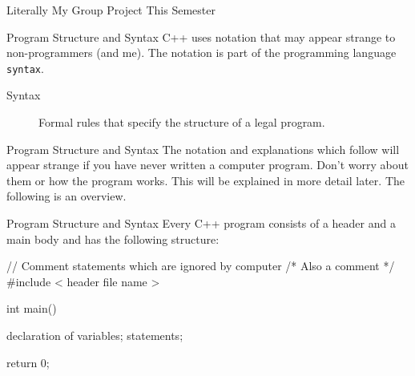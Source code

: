 \documentclass[../lecture1-introduction.tex]{subfiles}
\begin{document}

\begin{frame}[fragile]{Literally My Group Project This Semester}
    \begin{center}
    \end{center}
\end{frame}


\begin{frame}[fragile]{Program Structure and Syntax}
    C++ uses notation that may appear strange to non-programmers (and me).
    The notation is part of the programming language \texttt{syntax}.
    \begin{description}
        \item [Syntax] Formal rules that specify the structure of a legal program.
    \end{description}
\end{frame}

\begin{frame}[fragile]{Program Structure and Syntax}
    The notation and explanations which follow will appear strange if you have
    never written a computer program. \newline \newline
    Don't worry about them or how the program works. This will be explained
    in more detail later. \newline \newline
    The following is an overview.
\end{frame}

\begin{frame}[fragile]{Program Structure and Syntax}
    Every C++ program consists of a header and a main body and has the following
    structure:
\begin{cppcode}[]
// Comment statements which are ignored by computer
/* Also a comment */
#include < header file name >

int main()
{
    declaration of variables;
    statements;

    return 0;
}
\end{cppcode}
\end{frame}
\end{document}
